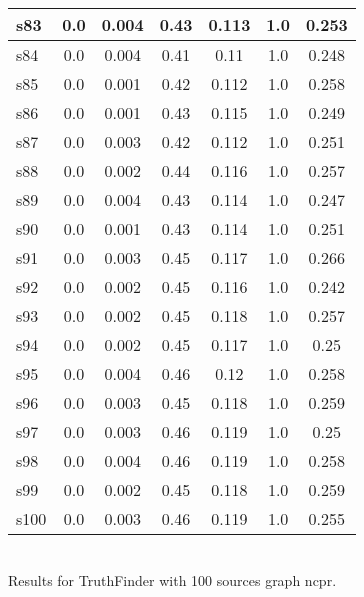 \documentclass{article}
\begin{document}
\begin{tabular}{|l|c|c|c|c|c|c|}
\hline
s83 &0.0 & 0.004 & 0.43 & 0.113 & 1.0 & 0.253\\
\hline
s84 &0.0 & 0.004 & 0.41 & 0.11 & 1.0 & 0.248\\
\hline
s85 &0.0 & 0.001 & 0.42 & 0.112 & 1.0 & 0.258\\
\hline
s86 &0.0 & 0.001 & 0.43 & 0.115 & 1.0 & 0.249\\
\hline
s87 &0.0 & 0.003 & 0.42 & 0.112 & 1.0 & 0.251\\
\hline
s88 &0.0 & 0.002 & 0.44 & 0.116 & 1.0 & 0.257\\
\hline
s89 &0.0 & 0.004 & 0.43 & 0.114 & 1.0 & 0.247\\
\hline
s90 &0.0 & 0.001 & 0.43 & 0.114 & 1.0 & 0.251\\
\hline
s91 &0.0 & 0.003 & 0.45 & 0.117 & 1.0 & 0.266\\
\hline
s92 &0.0 & 0.002 & 0.45 & 0.116 & 1.0 & 0.242\\
\hline
s93 &0.0 & 0.002 & 0.45 & 0.118 & 1.0 & 0.257\\
\hline
s94 &0.0 & 0.002 & 0.45 & 0.117 & 1.0 & 0.25\\
\hline
s95 &0.0 & 0.004 & 0.46 & 0.12 & 1.0 & 0.258\\
\hline
s96 &0.0 & 0.003 & 0.45 & 0.118 & 1.0 & 0.259\\
\hline
s97 &0.0 & 0.003 & 0.46 & 0.119 & 1.0 & 0.25\\
\hline
s98 &0.0 & 0.004 & 0.46 & 0.119 & 1.0 & 0.258\\
\hline
s99 &0.0 & 0.002 & 0.45 & 0.118 & 1.0 & 0.259\\
\hline
s100 &0.0 & 0.003 & 0.46 & 0.119 & 1.0 & 0.255\\
\hline
\end{tabular}\\

\noindent Results for TruthFinder with 100 sources graph ncpr.
\end{document}
